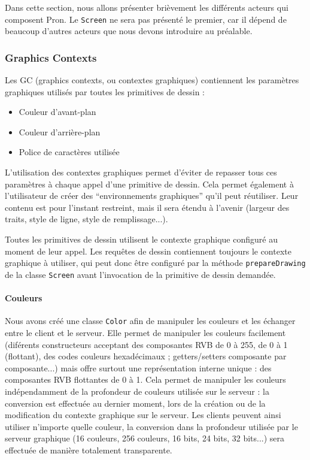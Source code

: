 Dans cette section, nous allons présenter brièvement les différents acteurs qui composent Pron. Le \verb|Screen| ne sera pas présenté le premier, car il dépend de beaucoup d'autres acteurs que nous devons introduire au préalable.

\subsubsection{Graphics Contexts}

Les GC (graphics contexts, ou contextes graphiques) contiennent les paramètres graphiques utilisés par toutes les primitives de dessin :
\begin{itemize}
  \item Couleur d'avant-plan
  \item Couleur d'arrière-plan
  \item Police de caractères utilisée
\end{itemize}

\vspace{1em}

L'utilisation des contextes graphiques permet d'éviter de repasser tous ces paramètres à chaque appel d'une primitive de dessin. Cela permet également à l'utilisateur de créer des ``environnements graphiques'' qu'il peut réutiliser. Leur contenu est pour l'instant restreint, mais il sera étendu à l'avenir (largeur des traits, style de ligne, style de remplissage...).

Toutes les primitives de dessin utilisent le contexte graphique configuré au moment de leur appel. Les requêtes de dessin contiennent toujours le contexte graphique à utiliser, qui peut donc être configuré par la méthode \verb|prepareDrawing| de la classe \verb|Screen| avant l'invocation de la primitive de dessin demandée.

\paragraph{Couleurs}
Nous avons créé une classe \verb|Color| afin de manipuler les couleurs et les échanger entre le client et le serveur. Elle permet de manipuler les couleurs facilement (diférents constructeurs acceptant des composantes RVB de 0 à 255, de 0 à 1 (flottant), des codes couleurs hexadécimaux ; getters/setters composante par composante...) mais offre surtout une représentation interne unique : des composantes RVB flottantes de 0 à 1. Cela permet de manipuler les couleurs indépendamment de la profondeur de couleurs utilisée sur le serveur : la conversion est effectuée au dernier moment, lors de la création ou de la modification du contexte graphique sur le serveur. Les clients peuvent ainsi utiliser n'importe quelle couleur, la conversion dans la profondeur utilisée par le serveur graphique (16 couleurs, 256 couleurs, 16 bits, 24 bits, 32 bits...) sera effectuée de manière totalement transparente.


